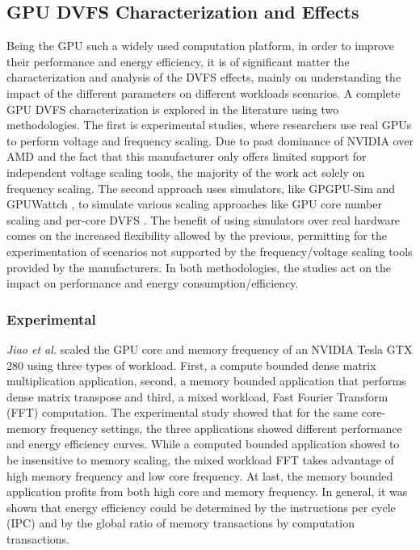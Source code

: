 \subsection{GPU DVFS Characterization and Effects}

Being the GPU such a widely used computation platform, in order to improve their performance and energy efficiency, it is of significant matter the characterization and analysis of the DVFS effects, mainly on understanding the impact of the different parameters on different workloads scenarios. A complete GPU DVFS characterization is explored in the literature using two methodologies. The first is experimental studies, where researchers use real GPUs to perform voltage and frequency scaling. Due to past dominance of NVIDIA over AMD \cite{noauthor_jon_nodate} \cite{mujtaba_amd_2019} and the fact that this manufacturer only offers limited support for independent voltage scaling tools, the majority of the work act solely on frequency scaling. The second approach uses simulators, like GPGPU-Sim \cite{noauthor_gpgpu-sim/gpgpu-sim_distribution_2019} and GPUWattch \cite{noauthor_gpu_nodate} \cite{leng_gpuwattch:_2013},  to simulate various scaling approaches like GPU core number scaling and per-core DVFS \cite{mei_survey_2016}. The benefit of using simulators over real hardware comes on the increased flexibility allowed by the previous, permitting for the experimentation of scenarios not supported by the frequency/voltage scaling tools provided by the manufacturers. In both methodologies, the studies act on the impact on performance and energy consumption/efficiency.

\subsubsection{Experimental}

\textit{Jiao et al.} \cite{jiao_power_2010} scaled the GPU core and memory frequency of an NVIDIA Tesla GTX 280 using three types of workload. First, a compute bounded dense matrix multiplication application, second, a memory bounded application that performs dense matrix transpose and third, a mixed workload, Fast Fourier Transform (FFT) computation. The experimental study showed that for the same core-memory frequency settings, the three applications showed different performance and energy efficiency curves. While a computed bounded application showed to be insensitive to memory scaling, the mixed workload FFT takes advantage of high memory frequency and low core frequency. At last, the memory bounded application profits from both high core and memory frequency. In general, it was shown that energy efficiency could be determined by the instructions per cycle (IPC) and by the global ratio of memory transactions by computation transactions.

